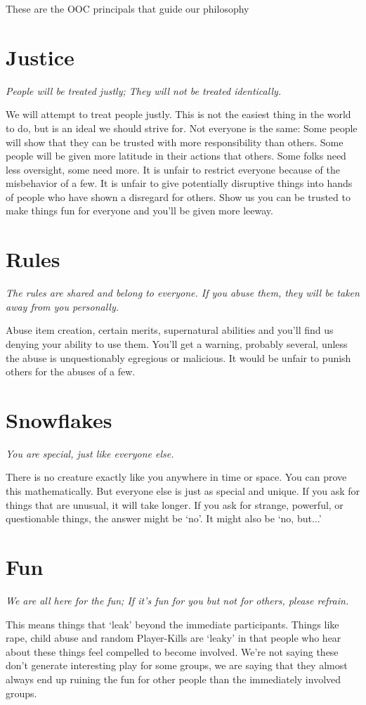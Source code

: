 These are the OOC principals that guide our philosophy
\section{Justice}
{\em People will be treated justly; They will not be treated identically.}

We will attempt to treat people justly.
This is not the easiest thing in the world to do, but is an ideal we should strive for.
Not everyone is the same:
Some people will show that they can be trusted with more responsibility than others.
Some people will be given more latitude in their actions that others.
Some folks need less oversight, some need more.
It is unfair to restrict everyone because of the misbehavior of a few.
It is unfair to give potentially disruptive things into hands of people who have shown a disregard for others.
Show us you can be trusted to make things fun for everyone and you'll be given more leeway.
\section{Rules}
{\em The rules are shared and belong to everyone.
If you abuse them, they will be taken away from you personally.}

Abuse item creation, certain merits, supernatural abilities and you'll find us denying your ability to use them.
You'll get a warning, probably several, unless the abuse is unquestionably egregious or malicious.
It would be unfair to punish others for the abuses of a few.
\section{Snowflakes}
{\em You are special, just like everyone else.}

There is no creature exactly like you anywhere in time or space.
You can prove this mathematically.
But everyone else is just as special and unique.
If you ask for things that are unusual, it will take longer.
If you ask for strange, powerful, or questionable things, the answer might be `no'.
It might also be `no, but...'
\section{Fun}
{\em We are all here for the fun; If it's fun for you but not for others, please refrain.}

This means things that `leak' beyond the immediate participants.
Things like rape, child abuse and random Player-Kills are `leaky' in that people who hear about these things feel compelled to become involved.
We're not saying these don't generate interesting play for some groups, we are saying that they almost always end up ruining the fun for other people than the immediately involved groups.
